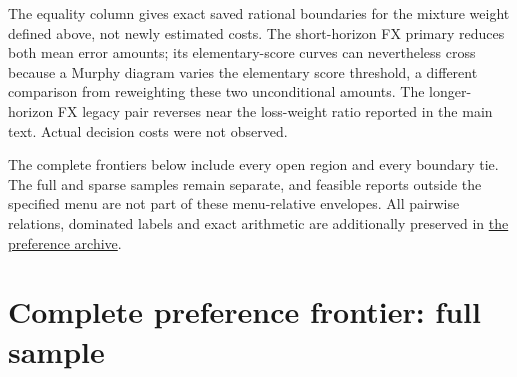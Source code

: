 \documentclass[11pt,a4paper]{article}
\begin{document}
The equality column gives exact saved rational boundaries for the mixture
weight defined above, not newly estimated costs. The short-horizon FX primary reduces both mean error amounts;
its elementary-score curves can nevertheless cross because a Murphy diagram
varies the elementary score threshold, a different comparison from reweighting
these two unconditional amounts. The longer-horizon FX legacy pair reverses
near the loss-weight ratio reported in the main text. Actual decision costs
were not observed.

The complete frontiers below include every open region and every boundary tie.
The full and sparse samples remain separate, and feasible reports outside the
specified menu are not part of these menu-relative envelopes. All pairwise
relations, dominated labels and exact arithmetic are additionally preserved in
\href{https://github.com/ByronLi0207/financial-mathematics-paper-20261020/blob/revision-v7-final/results/revision-20261022/preference-robustness/README.md}{the preference archive}.\section{Complete preference frontier: full sample}\label{sup:frontier-0}
\end{document}
